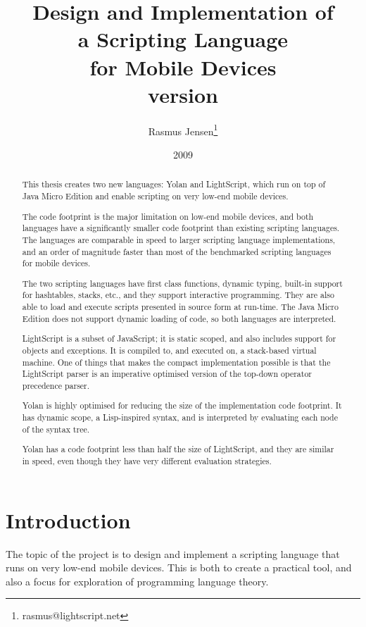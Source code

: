 \documentclass[11pt]{report}
\title{
Design and Implementation of \\
a Scripting Language \\ 
for Mobile Devices \\
{\scriptsize version }}
\author{
  Rasmus Jensen\footnote{
    rasmus@lightscript.net
  }
}
\date{2009}
\begin{document}
\maketitle
\begin{abstract}
This thesis creates two new languages: Yolan and LightScript, which run on top of Java Micro Edition and enable scripting on very low-end mobile devices.

The code footprint is the major limitation on low-end mobile devices, and both languages have a significantly smaller code footprint than existing scripting languages. 
The languages are comparable in speed to larger scripting language implementations,
and an order of magnitude faster than most of the benchmarked scripting languages for mobile devices.

The two scripting languages have first class functions, dynamic typing, built-in support for hashtables, stacks, etc., and they support interactive programming. They are also able to load and execute scripts presented in source form at run-time. 
The Java Micro Edition does not support dynamic loading of code, so both languages are interpreted.

LightScript is a subset of JavaScript; it is static scoped, and also includes support for objects and exceptions. It is compiled to, and executed on, a stack-based virtual machine. One of things that makes the compact implementation possible is that the LightScript parser is an imperative optimised version of the top-down operator precedence parser.

Yolan is highly optimised for reducing the size of the implementation code footprint. It has dynamic scope, a Lisp-inspired syntax, and is interpreted by evaluating each node of the syntax tree.

Yolan has a code footprint less than half the size of LightScript, and they are similar in speed, even though they have very different evaluation strategies.
\end{abstract}

\setcounter{tocdepth}{1}
\tableofcontents

\chapter{Introduction}

    The topic of the project is to design and implement a scripting language
that runs on very low-end mobile devices. This is both to create a practical tool, and
also a focus for exploration of programming language theory. 
\end{document}
